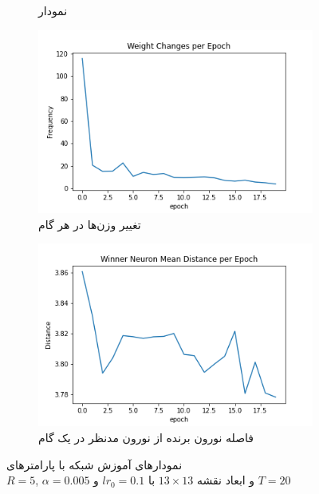 \documentclass[12pt, a4paper]{article}
\begin{document}
\begin{figure}[h]
\begin{subfigure}{0.45\linewidth}
        \caption{نمودار }
    \end{subfigure}
    \newline
    \begin{subfigure}{0.45\linewidth}
        \includegraphics[width=\linewidth]{images/q5/r16/weight_change.png}
        \caption{تغییر وزن‌ها در هر گام}
    \end{subfigure}
    \hfill
    \begin{subfigure}{0.45\linewidth}
        \includegraphics[width=\linewidth]{images/q5/r16/winner_distance.png}
        \caption{فاصله نورون برنده از نورون مدنظر در یک گام}
    \end{subfigure}
    \caption{نمودار‌های آموزش شبکه  با پارامتر‌های \\$R=5$, $\alpha=0.005$ و ابعاد نقشه $13 \times 13$ با $lr_0=0.1$ و $T=20$}
    \label{r16}
\end{figure}
\end{document}
